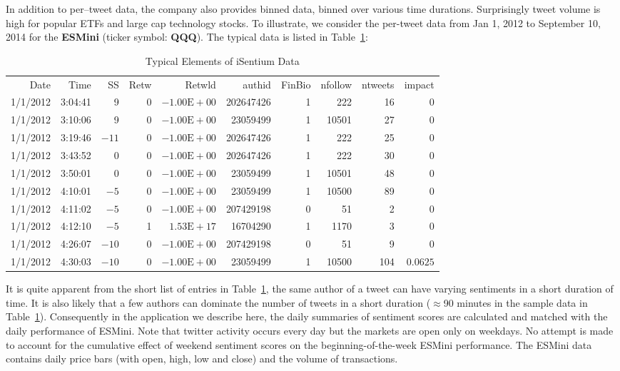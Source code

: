 In addition to per--tweet data, the company also provides binned data, binned over various time durations. Surprisingly tweet volume is high for popular ETFs and large cap technology stocks. To illustrate, we consider the per-tweet data from Jan 1, 2012 to September 10, 2014 for the \textbf{ESMini} (ticker symbol: \textbf{QQQ}). The typical data is listed in Table~\ref{tab:isentiumdata}:

        \begin{table}[!ht]
        \centering
        \caption{Typical Elements of iSentium Data \label{tab:isentiumdata}}
        \hspace*{-1.8cm}
        \begin{tabular}{rrrrrrrrrr}
        Date & Time & SS & Retw & Retwld & authid & FinBio & nfollow & ntweets & impact \\
        1/1/2012 & 3:04:41 & 9 & 0 & $-1.00\text{E}+00$ & 202647426 & 1 & 222 & 16 & 0 \\
        1/1/2012 & 3:10:06 & 9 & 0 & $-1.00\text{E}+00$ & 23059499 & 1 & 10501 & 27 & 0 \\
        1/1/2012 & 3:19:46 & $-11$ & 0 & $-1.00\text{E}+00$ & 202647426 & 1 & 222 & 25 & 0 \\
        1/1/2012 & 3:43:52 & 0 & 0 & $-1.00\text{E}+00$ & 202647426 & 1 & 222 & 30 & 0 \\
        1/1/2012 & 3:50:01 & 0 & 0 & $-1.00\text{E}+00$ & 23059499 & 1 & 10501 & 48 & 0 \\
        1/1/2012 & 4:10:01 & $-5$ & 0 & $-1.00\text{E}+00$ & 23059499 & 1 & 10500 & 89 & 0 \\
        1/1/2012 & 4:11:02 &  $-5$ & 0 & $-1.00\text{E}+00$ & 207429198 & 0 & 51 & 2 & 0 \\
        1/1/2012 & 4:12:10 &  $-5$ & 1 & $1.53\text{E}+17$ & 16704290 & 1& 1170 & 3 & 0 \\
        1/1/2012 & 4:26:07 & $-10$ & 0 & $-1.00\text{E}+00$ & 207429198 & 0 & 51 & 9 & 0 \\
        1/1/2012 & 4:30:03 & $-10$ & 0 & $-1.00\text{E}+00$ & 23059499 &	1 & 10500	 & 104 & $0.0625$ 
        \end{tabular}
        \end{table}


It is quite apparent from the short list of entries in Table~\ref{tab:isentiumdata}, the same author of a tweet can have varying sentiments in a short duration of time. It is also likely that a few authors can dominate the number of tweets in a short duration ($\approx$90 minutes in the sample data in Table~\ref{tab:isentiumdata}). Consequently in the application we describe here, the daily summaries of sentiment scores are calculated and matched with the daily performance of ESMini. Note that twitter activity occurs every day but the markets are open only on weekdays. No attempt is made to account for the cumulative effect of weekend sentiment scores on the beginning-of-the-week ESMini performance. The ESMini data contains daily price bars (with open, high, low and close) and the volume of transactions.


